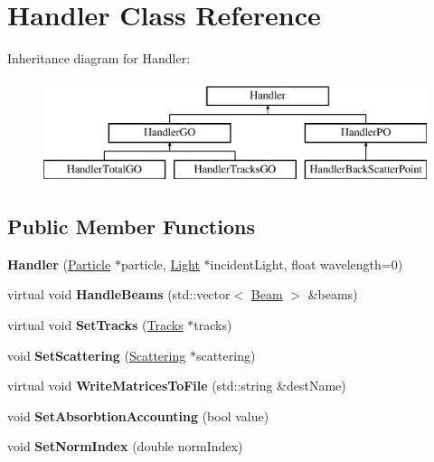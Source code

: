 \hypertarget{class_handler}{}\section{Handler Class Reference}
\label{class_handler}
Inheritance diagram for Handler\+:\begin{figure}[H]
\begin{center}
\leavevmode
\includegraphics[height=3.000000cm]{class_handler}
\end{center}
\end{figure}
\subsection*{Public Member Functions}
\begin{DoxyCompactItemize}
\item 
\mbox{\label{class_handler_a66ed760e6f799ed1c23bb7a6e911877a}} 
{\bfseries Handler} (\mbox{\hyperlink{class_particle}{Particle}} $\ast$particle, \mbox{\hyperlink{class_light}{Light}} $\ast$incident\+Light, float wavelength=0)
\item 
\mbox{\label{class_handler_a05194b66451cc40133c4bd1a209ad530}} 
virtual void {\bfseries Handle\+Beams} (std\+::vector$<$ \mbox{\hyperlink{class_beam}{Beam}} $>$ \&beams)
\item 
\mbox{\label{class_handler_a3ef5c3e3392e658c693275a4d46567ba}} 
virtual void {\bfseries Set\+Tracks} (\mbox{\hyperlink{class_tracks}{Tracks}} $\ast$tracks)
\item 
\mbox{\label{class_handler_ae113de0f27a2bac6dbd556c7162aed3e}} 
void {\bfseries Set\+Scattering} (\mbox{\hyperlink{class_scattering}{Scattering}} $\ast$scattering)
\item 
\mbox{\label{class_handler_a36b5f50775023a5d8acaf5b57e2295b2}} 
virtual void {\bfseries Write\+Matrices\+To\+File} (std\+::string \&dest\+Name)
\item 
\mbox{\label{class_handler_a4e0616dee14ef67e077209a66f9d48d7}} 
void {\bfseries Set\+Absorbtion\+Accounting} (bool value)
\item 
\mbox{\label{class_handler_af47c4ac1eeb273bd27d8e6688131ff6c}} 
void {\bfseries Set\+Norm\+Index} (double norm\+Index)
\end{DoxyCompactItemize}
